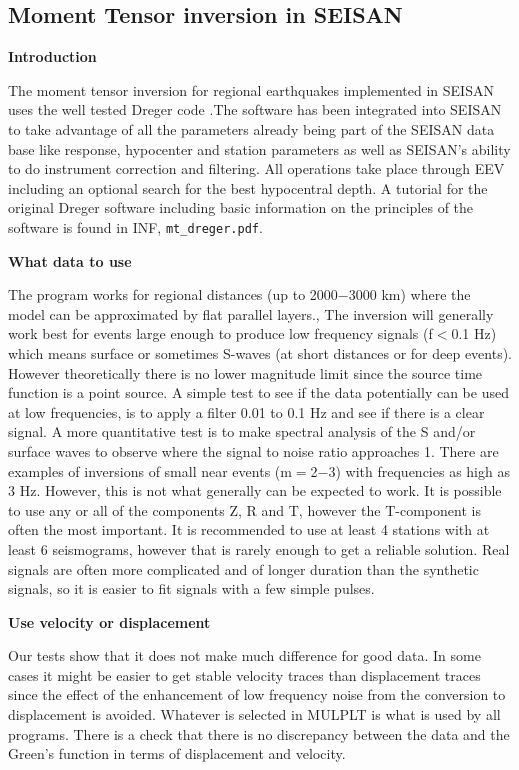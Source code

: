 \subsection{Moment Tensor inversion in SEISAN}
\label{sect:Dreger}

\textbf{Introduction}

The moment tensor inversion for regional earthquakes implemented in SEISAN uses the well tested Dreger code \citep{dreger2003}.The software has been integrated into SEISAN to take advantage of all the parameters already being part of the SEISAN data base like response, hypocenter and station parameters as well as SEISAN's ability to do instrument correction and filtering. All operations take place through EEV including an optional search for the best hypocentral depth. A tutorial for the original Dreger software including basic information on the principles of the software is found in INF, \texttt{mt\_dreger.pdf}.

\textbf{What data to use}

The program works for regional distances (up to 2000$-$3000 km) where the model can be approximated by flat parallel layers., The inversion will generally work best for events large enough to produce low frequency signals (f$<$0.1 Hz) which means surface or sometimes S-waves (at short distances or for deep events). However theoretically there is no lower magnitude limit since the source time function is a point source. A simple test to see if the data  potentially can  be used at low frequencies, is to apply a filter 0.01 to 0.1 Hz and see if there is a clear signal. A more quantitative test is to make spectral analysis of the S and/or surface waves to observe where the signal to noise ratio approaches 1. There are examples of inversions of small near events (m$=$2$-$3) with frequencies as high as 3 Hz. However, this is not what generally can be expected to work.
It is possible to use any or all of the components Z, R and T, however the T-component is often the most important. It is recommended to use at least 4 stations with at least 6 seismograms, however that is rarely enough to get a reliable solution. Real signals are often more complicated and of longer duration than the synthetic signals, so it is easier to fit  signals with a few simple pulses.

\textbf{Use velocity or displacement}

Our tests show that it does not make much difference for good data. In some cases it might be easier to get stable velocity traces than displacement traces since the effect of the enhancement of  low frequency noise from the conversion to displacement is avoided. Whatever is selected in MULPLT is what is used by all programs. There is a check that there is no discrepancy between the data and the Green's function in terms of displacement and velocity.

